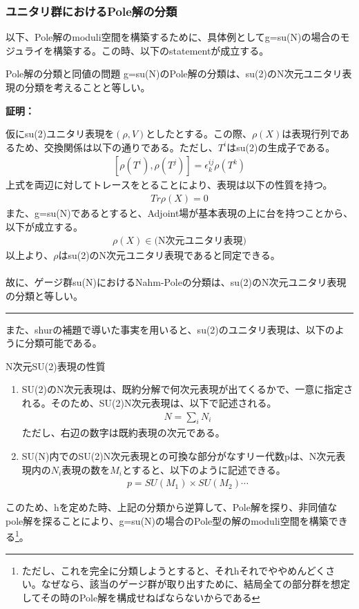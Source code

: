 \documentclass[dvipdfmx,a4paper,10.5pt]{article}
\numberwithin{equation}{section}
\newenvironment{proofbox}
{\begin{prooflabel}\textbf{証明：}\end{prooflabel}\vspace{0.8em}}
{\par\vspace{1em}\hrule\vspace{1em}}
\begin{document}
\subsubsection{ユニタリ群におけるPole解の分類}
以下、Pole解のmoduli空間を構築するために、具体例としてg=su(N)の場合のモジュライを構築する。この時、以下のstatementが成立する。
\begin{resultbox}{Pole解の分類と同値の問題}
    g=su(N)のPole解の分類は、su(2)のN次元ユニタリ表現の分類を考えることと等しい。
\end{resultbox}
\begin{proofbox}
仮にsu(2)ユニタリ表現を$(\rho,V)$としたとする。この際、$\rho(X)$は表現行列であるため、交換関係は以下の通りである。ただし、$T^{i}$はsu(2)の生成子である。
\begin{equation}\begin{split}
    [\rho(T^{i}),\rho(T^{j})]=\epsilon^{ij}_{k}\rho(T^{k})
\end{split} \end{equation}
上式を両辺に対してトレースをとることにより、表現は以下の性質を持つ。
\begin{equation}\begin{split}
    Tr \rho(X)=0
\end{split} \end{equation}
また、g=su(N)であるとすると、Adjoint場が基本表現の上に台を持つことから、以下が成立する。
\begin{align*}
    \rho(X)\in \text{(N次元ユニタリ表現)}
\end{align*}
以上より、$\rho$はsu(2)のN次元ユニタリ表現であると同定できる。\\
\\
故に、ゲージ群su(N)におけるNahm-Poleの分類は、su(2)のN次元ユニタリ表現の分類と等しい。    
\end{proofbox}
また、shurの補題で導いた事実を用いると、su(2)のユニタリ表現は、以下のように分類可能である。
\begin{resultbox}{N次元SU(2)表現の性質}
\begin{enumerate}
    \item SU(2)のN次元表現は、既約分解で何次元表現が出てくるかで、一意に指定される。そのため、SU(2)N次元表現は、以下で記述される。
    \begin{align*}
        N=\sum_{i}N_{i}
    \end{align*}
    ただし、右辺の数字は既約表現の次元である。
    \item SU(N)内でのSU(2)N次元表現との可換な部分がなすリー代数pは、N次元表現内の$N_{i}$表現の数を$M_{i}$とすると、以下のように記述できる。
    \begin{align*}
        p=SU(M_{1})\times SU(M_{2})\cdots
    \end{align*}
\end{enumerate}
\end{resultbox}
このため、hを定めた時、上記の分類から逆算して、Pole解を探り、非同値なpole解を探ることにより、g=su(N)の場合のPole型の解のmoduli空間を構築できる\footnote{ただし、これを完全に分類しようとすると、それhそれでややめんどくさい。なぜなら、該当のゲージ群が取り出すために、結局全ての部分群を想定してその時のPole解を構成せねばならないからである}。
\end{document}
